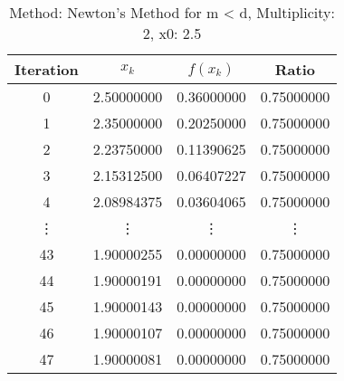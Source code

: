 \begin{table}
\centering
\caption{Method: Newton's Method for m < d, Multiplicity: 2, x0: 2.5}
\label{tab:table_Newton's_Method_for_m_<_d_2_2_5}
\begin{tabular}{c c c c}
\toprule
Iteration &      $x_k$ &   $f(x_k)$ &      Ratio \\
\midrule
        0 & 2.50000000 & 0.36000000 & 0.75000000 \\
        1 & 2.35000000 & 0.20250000 & 0.75000000 \\
        2 & 2.23750000 & 0.11390625 & 0.75000000 \\
        3 & 2.15312500 & 0.06407227 & 0.75000000 \\
        4 & 2.08984375 & 0.03604065 & 0.75000000 \\
   \vdots &     \vdots &     \vdots &     \vdots \\
       43 & 1.90000255 & 0.00000000 & 0.75000000 \\
       44 & 1.90000191 & 0.00000000 & 0.75000000 \\
       45 & 1.90000143 & 0.00000000 & 0.75000000 \\
       46 & 1.90000107 & 0.00000000 & 0.75000000 \\
       47 & 1.90000081 & 0.00000000 & 0.75000000 \\
\bottomrule
\end{tabular}
\end{table}
